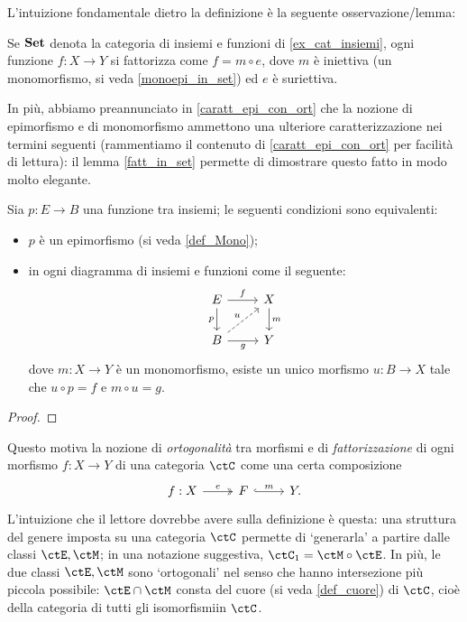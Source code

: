 \medskip
L'intuizione fondamentale dietro la definizione è la seguente osservazione/lemma: 
\begin{lemma}\label{fatt_in_set}
  Se $\mathbf{Set}$ denota la categoria di insiemi e funzioni di \ref{ex_cat_insiemi}, ogni funzione $f : X \to Y$ si fattorizza come $f = m \circ e$, dove $m$ è iniettiva (un monomorfismo, si veda \ref{monoepi_in_set}) ed $e$ è suriettiva.%
\end{lemma}
In più, abbiamo preannunciato in \ref{caratt_epi_con_ort} che la nozione di epimorfismo e di monomorfismo ammettono una ulteriore caratterizzazione nei termini seguenti (rammentiamo il contenuto di \ref{caratt_epi_con_ort} per facilità di lettura): il lemma \ref{fatt_in_set} permette di dimostrare questo fatto in modo molto elegante.
\begin{proposition*}
Sia $p : E \to B$ una funzione tra insiemi; le seguenti condizioni sono equivalenti:
\begin{itemize}
  \item $p$ è un epimorfismo (si veda \ref{def_Mono});
  \item in ogni diagramma di insiemi e funzioni come il seguente: 
    \[\begin{tikzcd}
      E \ar[r, "f"]\ar[d, "p"']& X \ar[d, "m"]\\ 
      B \ar[r, "g"'] \ar[ur, dashed, "u"]& Y
    \end{tikzcd}\]
    dove $m : X\to Y$ è un monomorfismo, esiste un unico morfismo $u : B\to X$ tale che $u\circ p = f$ e $m\circ u = g$.
\end{itemize}
\end{proposition*}
\begin{proof}
  \Todo{}
\end{proof}

Questo motiva la nozione di \emph{ortogonalità} tra morfismi e di \emph{fattorizzazione} di ogni morfismo \(f : X\to Y\) di una categoria \(\ctC\) come una certa composizione
\[
  \begin{tikzcd}
    f : X \ar[r, "e", two heads]& F \ar[r, "m", hook] & Y. 
  \end{tikzcd}
\]
L'intuizione che il lettore dovrebbe avere sulla definizione è questa: una struttura del genere imposta su una categoria $\ctC$ permette di `generarla' a partire dalle classi \(\ctE,\ctM\); in una notazione suggestiva, \(\ctC_1 = \ctM\circ \ctE\). In più, le due classi $\ctE,\ctM$ sono `ortogonali' nel senso che hanno intersezione più piccola possibile: $\ctE\cap \ctM$ consta del cuore (si veda \ref{def_cuore}) di $\ctC$, cioè della categoria di tutti gli isomorfismiin $\ctC$.

